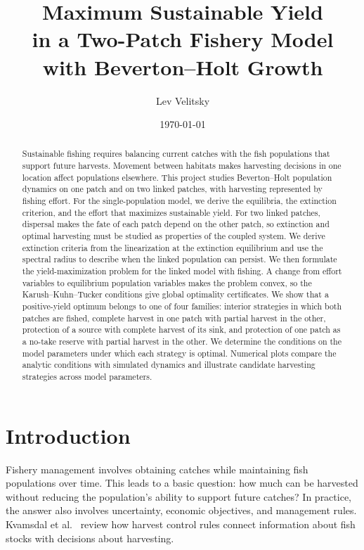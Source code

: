 \documentclass{article}
\title{Maximum Sustainable Yield\\ in a Two-Patch Fishery Model\\ with Beverton--Holt Growth}
\author{Lev Velitsky}
\date{\today}
\numberwithin{equation}{section}
\begin{document}
\hypersetup{pageanchor=false}

\setcounter{page}{1}
\hypersetup{pageanchor=true}
\begin{abstract}
Sustainable fishing requires balancing current catches with the fish
populations that support future harvests. Movement between habitats makes
harvesting decisions in one location affect populations elsewhere.
This project studies Beverton--Holt population dynamics on one patch and
on two linked patches, with harvesting represented by fishing effort.
For the single-population model, we derive the equilibria, the
extinction criterion, and the effort that maximizes sustainable yield.
For two linked patches, dispersal makes the fate of each patch depend
on the other patch, so extinction and optimal harvesting must be
studied as properties of the coupled system. We derive extinction
criteria from the linearization at the
extinction equilibrium and use the spectral radius to describe when the
linked population can persist. We then formulate the yield-maximization
problem for the linked model with fishing. A change from effort
variables to equilibrium population variables makes the problem
convex, so the Karush--Kuhn--Tucker conditions give global optimality
certificates. We show that a positive-yield optimum belongs to one
of four families: interior strategies in which both patches are fished,
complete harvest in one patch with partial harvest in the other,
protection of a source with complete harvest of its sink, and protection
of one patch as a no-take reserve with partial harvest in the other. We determine
the conditions on the model parameters under which each strategy is
optimal. Numerical plots compare the analytic conditions
with simulated dynamics and illustrate candidate harvesting strategies
across model parameters.
\end{abstract}

\section{Introduction}
Fishery management involves obtaining catches while maintaining fish
populations over time. This leads to a basic question: how much can be
harvested without reducing the population's ability to support future
catches? In practice, the answer
also involves uncertainty, economic objectives, and management rules.
Kvamsdal et al.\ \cite{kvamsdal-2016} review how harvest control rules
connect information about fish stocks with decisions about harvesting.
\end{document}
